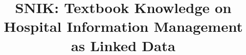 \documentclass[conference]{IEEEtran}
\begin{document}

\title{SNIK: Textbook Knowledge on Hospital Information Management as Linked Data}

\end{document}
